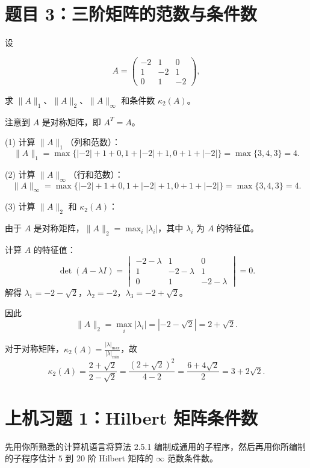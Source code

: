\documentclass{article}
\begin{document}
\section{题目 3：三阶矩阵的范数与条件数}

设

\[
  A =
  \begin{pmatrix}
    -2 & 1 & 0 \\
    1 & -2 & 1 \\
    0 & 1 & -2
  \end{pmatrix},
\]

求 $\|A\|_1$、$\|A\|_2$、$\|A\|_\infty$ 和条件数 $\kappa_2(A)$。

\begin{solution}
  注意到 $A$ 是对称矩阵，即 $A^T = A$。

  (1) 计算 $\|A\|_1$（列和范数）：
  \[
    \|A\|_1 = \max\{|{-2}|+1+0, 1+|{-2}|+1, 0+1+|{-2}|\} = \max\{3, 4, 3\} = 4.
  \]

  (2) 计算 $\|A\|_\infty$（行和范数）：
  \[
    \|A\|_\infty = \max\{|{-2}|+1+0, 1+|{-2}|+1, 0+1+|{-2}|\} =
    \max\{3, 4, 3\} = 4.
  \]

  (3) 计算 $\|A\|_2$ 和 $\kappa_2(A)$：

  由于 $A$ 是对称矩阵，$\|A\|_2 = \max_i |\lambda_i|$，其中 $\lambda_i$ 为 $A$ 的特征值。

  计算 $A$ 的特征值：
  \[
    \det(A - \lambda I) =
    \begin{vmatrix} -2-\lambda & 1 & 0 \\ 1 & -2-\lambda & 1 \\ 0 & 1
      & -2-\lambda
    \end{vmatrix} = 0.
  \]
  解得 $\lambda_1 = -2 - \sqrt{2}$，$\lambda_2 = -2$，$\lambda_3 = -2 + \sqrt{2}$。

  因此
  \[
    \|A\|_2 = \max_i |\lambda_i| = |-2-\sqrt{2}| = 2 + \sqrt{2}.
  \]

  对于对称矩阵，$\kappa_2(A) = \frac{|\lambda|_{\max}}{|\lambda|_{\min}}$，故
  \[
    \kappa_2(A) = \frac{2+\sqrt{2}}{2-\sqrt{2}} =
    \frac{(2+\sqrt{2})^2}{4-2} = \frac{6+4\sqrt{2}}{2} = 3 + 2\sqrt{2}.
  \]
\end{solution}

\section{上机习题 1：Hilbert 矩阵条件数}

先用你所熟悉的计算机语言将算法 2.5.1 编制成通用的子程序，然后再用你所编制的子程序估计 $5$ 到 $20$ 阶 Hilbert
矩阵的 $\infty$ 范数条件数。
\end{document}
